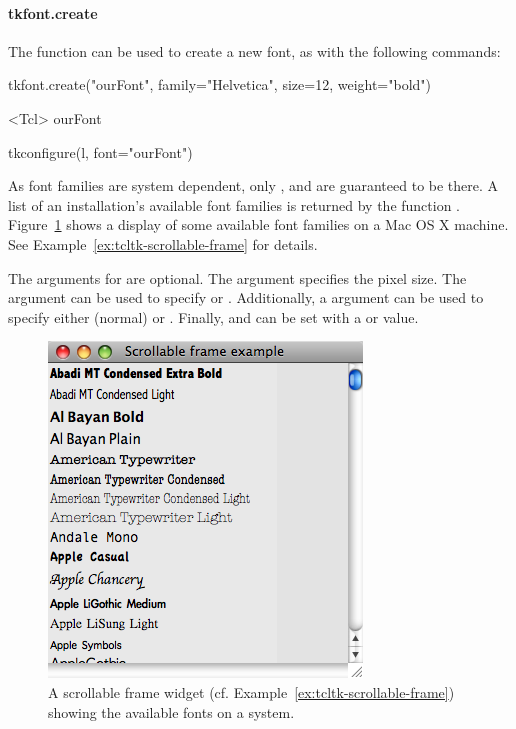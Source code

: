 \paragraph{tkfont.create}
The  function can be used to create a new font, as with the following commands:
\begin{Schunk}
\begin{Sinput}
 tkfont.create("ourFont", family="Helvetica", size=12, 
               weight="bold")
\end{Sinput}
\begin{Soutput}
<Tcl> ourFont 
\end{Soutput}
\begin{Sinput}
 tkconfigure(l, font="ourFont")
\end{Sinput}
\end{Schunk}

As font families are system dependent, only ,
 and  are guaranteed to be there. A list
of an installation's available font families is returned by the
function .
Figure~\ref{fig:fig-tcltk-all-fonts} shows a display of some available
font families on a Mac OS X machine.  See
Example~\ref{ex:tcltk-scrollable-frame} for details.

The arguments for  are optional. The
 argument specifies the pixel size. The
 argument can be used to specify
 or .  Additionally, a
 argument can be used to specify either
 (normal) or . Finally,
 and
 can be set with a  or
 value.


\begin{figure}
  \centering
  \includegraphics[width=.6\textwidth]{fig-tcltk-all-fonts.png}
  \caption{A scrollable frame widget (cf. Example~\ref{ex:tcltk-scrollable-frame}) showing the available fonts on a system.}
  \label{fig:fig-tcltk-all-fonts}
\end{figure}


